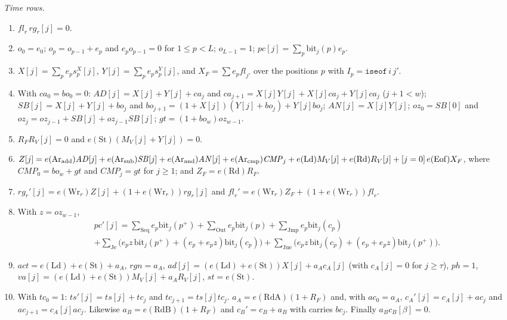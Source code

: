 \documentclass[11pt,letterpaper]{article}
\theoremstyle{definition}
\theoremstyle{remark}
\begin{document}
\emph{Time rows.}
\begin{enumerate}[label=(T\arabic*)]
\item \(\mathit{fl}_r\,\mathit{rg}_r[j]=0\).
\item \(o_0=e_0\); \(o_p=o_{p-1}+e_p\) and \(e_po_{p-1}=0\) for
\(1\le p<L\); \(o_{L-1}=1\); \(\mathit{pc}[j]=\sum_p\mathrm{bit}_j(p)e_p\).
\item \(X[j]=\sum_pe_ps^X_p[j]\), \(Y[j]=\sum_pe_ps^Y_p[j]\), and
\(X_F=\sum e_p\mathit{fl}_{j'}\) over the positions \(p\) with
\(I_p=\mathtt{iseof}\,i\,j'\).
\item With \(\mathit{ca}_0=\mathit{bo}_0=0\):
\(\mathit{AD}[j]=X[j]+Y[j]+\mathit{ca}_j\) and
\(\mathit{ca}_{j+1}=X[j]Y[j]+X[j]\mathit{ca}_j+Y[j]\mathit{ca}_j\)
(\(j+1<w\)); \(\mathit{SB}[j]=X[j]+Y[j]+\mathit{bo}_j\) and
\(\mathit{bo}_{j+1}=(1+X[j])(Y[j]+\mathit{bo}_j)+Y[j]\mathit{bo}_j\);
\(\mathit{AN}[j]=X[j]Y[j]\); \(\mathit{oz}_0=\mathit{SB}[0]\) and
\(\mathit{oz}_j=\mathit{oz}_{j-1}+\mathit{SB}[j]+\mathit{oz}_{j-1}
\mathit{SB}[j]\); \(\mathit{gt}=(1+\mathit{bo}_w)\mathit{oz}_{w-1}\).
\item \(R_FR_V[j]=0\) and \(e(\mathrm{St})(M_V[j]+Y[j])=0\).
\item \(Z[j]=e(\mathrm{Ar}_{\rm add})\mathit{AD}[j]
+e(\mathrm{Ar}_{\rm sub})\mathit{SB}[j]+e(\mathrm{Ar}_{\rm and})
\mathit{AN}[j]+e(\mathrm{Ar}_{\rm cmp})\mathit{CMP}_j+e(\mathrm{Ld})
M_V[j]+e(\mathrm{Rd})R_V[j]+[j=0]\,e(\mathrm{Eof})X_F\), where
\(\mathit{CMP}_0=\mathit{bo}_w+\mathit{gt}\) and
\(\mathit{CMP}_j=\mathit{gt}\) for \(j\ge1\); and
\(Z_F=e(\mathrm{Rd})R_F\).
\item \(\mathit{rg}_r'[j]=e(\mathrm{Wr}_r)Z[j]+(1+e(\mathrm{Wr}_r))
\mathit{rg}_r[j]\) and \(\mathit{fl}_r'=e(\mathrm{Wr}_r)Z_F
+(1+e(\mathrm{Wr}_r))\mathit{fl}_r\).
\item With \(z=\mathit{oz}_{w-1}\),
\begin{multline*}
 \mathit{pc}'[j]=\sum_{\mathrm{Seq}}e_p\mathrm{bit}_j(p^+)
 +\sum_{\mathrm{Out}}e_p\mathrm{bit}_j(p)
 +\sum_{\mathrm{Jmp}}e_p\mathrm{bit}_j(c_p)\\
 +\sum_{\mathrm{Je}}\bigl(e_pz\,\mathrm{bit}_j(p^+)
 +(e_p+e_pz)\mathrm{bit}_j(c_p)\bigr)
 +\sum_{\mathrm{Jne}}\bigl(e_pz\,\mathrm{bit}_j(c_p)
 +(e_p+e_pz)\mathrm{bit}_j(p^+)\bigr).
\end{multline*}
\item \(\mathit{act}=e(\mathrm{Ld})+e(\mathrm{St})+a_A\),
\(\mathit{rgn}=a_A\),
\(\mathit{ad}[j]=(e(\mathrm{Ld})+e(\mathrm{St}))X[j]+a_Ac_A[j]\)
(with \(c_A[j]=0\) for \(j\ge\tau\)), \(\mathit{ph}=1\),
\(\mathit{va}[j]=(e(\mathrm{Ld})+e(\mathrm{St}))M_V[j]+a_AR_V[j]\),
\(\mathit{st}=e(\mathrm{St})\).
\item With \(\mathit{tc}_0=1\): \(\mathit{ts}'[j]=\mathit{ts}[j]
+\mathit{tc}_j\) and \(\mathit{tc}_{j+1}=\mathit{ts}[j]\mathit{tc}_j\).
\(a_A=e(\mathrm{RdA})(1+R_F)\) and, with \(\mathit{ac}_0=a_A\),
\(c_A'[j]=c_A[j]+\mathit{ac}_j\) and
\(\mathit{ac}_{j+1}=c_A[j]\mathit{ac}_j\). Likewise
\(a_B=e(\mathrm{RdB})(1+R_F)\) and \(c_B'=c_B+a_B\) with carries
\(\mathit{bc}_j\). Finally \(a_Bc_B[\beta]=0\).
\end{enumerate}
\end{document}
